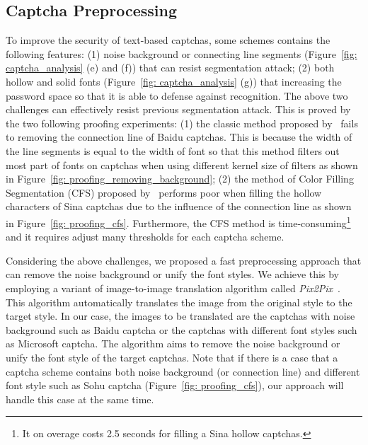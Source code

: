 \subsection{Captcha Preprocessing}
To improve the security of text-based captchas, some schemes contains the following features: (1) noise background or connecting line segments (Figure~\ref{fig: captcha_analysis} (e) and (f)) that can resist segmentation attack; (2) both hollow and solid fonts (Figure~\ref{fig: captcha_analysis} (g)) that increasing the password space so that it is able to defense against recognition. The above two challenges can effectively resist previous segmentation attack. This is proved by the two following proofing experiments: (1) the classic method proposed by~\cite{Yan2008A} fails to removing the connection line of Baidu captchas. This is because the width of the line segments is equal to the width of font so that this method filters out most part of fonts on captchas when using different kernel size of filters as shown in Figure~\ref{fig: proofing_removing_background}; (2) the method of Color Filling Segmentation (CFS) proposed by~\cite{Yan2008A} performs poor when filling the hollow characters of Sina captchas due to the influence of the connection line as shown in Figure~\ref{fig: proofing_cfs}. Furthermore, the CFS method is time-consuming\footnote{It on overage costs 2.5 seconds for filling a Sina hollow captchas.} and it requires adjust many thresholds for each captcha scheme.

Considering the above challenges, we proposed a fast preprocessing approach that can remove the noise background or unify the font styles. We achieve this by employing a variant of image-to-image translation algorithm called \emph{Pix2Pix}~\cite{Pix2PixCode}. This algorithm automatically translates the image from the original style to the target style. In our case, the images to be translated are the captchas with noise background such as Baidu captcha or the captchas with different font styles such as Microsoft captcha. The algorithm aims to remove the noise background or unify the font style of the target captchas. Note that if there is a case that a captcha scheme contains both noise background (or connection line) and different font style such as Sohu captcha (Figure~\ref{fig: proofing_cfs}), our approach will handle this case at the same time.

